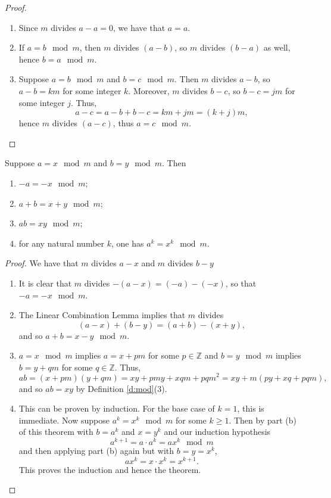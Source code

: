 \documentclass[11pt,dvipsnames]{book}
\numberwithin{figure}{section} %
\numberwithin{table}{section} %
\begin{document}
\begin{proof}
\begin{enumerate}[label=(\alph*)]
\item Since $m$ divides $a-a=0$, we have that $a = a$.
\item If $a = b\mod m$, then $m$ divides $(a-b)$, so $m$ divides $(b-a)$ as well, hence $b = a \mod m$.
\item Suppose $a = b \mod m$ and $b = c\mod m$. Then $m$ divides $a-b$, so $a-b=km$ for some integer $k$. Moreover, $m$ divides $b-c$, so $b-c=jm$ for some integer $j$. Thus,
\[
a-c = a-b+b-c = km+jm = (k+j)m,\]
hence $m$ divides $(a-c)$, thus $a = c \mod m$.\qedhere
\end{enumerate}
\end{proof}

\begin{theorem}%
\label{t:mod-artithmetic}
Suppose $a  = x \mod m$ and $b = y \mod m$. Then
\begin{enumerate}[label=(\alph*)]
\item $-a = -x \mod m$;
\item $a+b = x+y \mod m$;
\item $ab  = xy \mod m$;
\item for any natural number $k$, one has $a^{k} = x^{k} \mod m$.
\end{enumerate}
\end{theorem}

\begin{proof}
We have that $m$ divides $a-x$ and $m$ divides $b-y$
\begin{enumerate}[label=(\alph*)]
\item It is clear that $m$ divides $-(a-x)=(-a)-(-x)$, so that $-a = -x \mod m$.
\item The Linear Combination Lemma implies that $m$ divides
\[
(a-x)+(b-y)=(a+b)-(x+y),
\]
and so $a+b = x-y\mod m$.
\item $a = x \mod m$ implies $a=x+pm$ for some $p\in\mathbb{Z}$ and $b = y \mod m$ implies $b=y+qm$ for some $q\in\mathbb{Z}$. Thus,
\[
ab = (x+pm)(y+qm) = xy+pmy+xqm+ pqm^2 = xy + m(py+xq+pqm),\]
and so $ab = xy$ by Definition \ref{d:mod}(3).
\item This can be proven by induction. For the base case of $k=1$, this is immediate. Now suppose $a^{k} = x^{k}\mod m$ for some $k\geq 1$. Then by part (b) of this theorem with $b=a^{k}$ and $x=y^{k}$ and our induction hypothesis
\[
a^{k+1}=a\cdot a^{k} = a x^{k} \mod m\]
and then applying part (b) again but with $b=y=x^k$,
\[
a x^{k} = x\cdot x^k=x^{k+1}.\]
This proves the induction and hence the theorem. \qedhere
\end{enumerate}
\end{proof}
\end{document}

